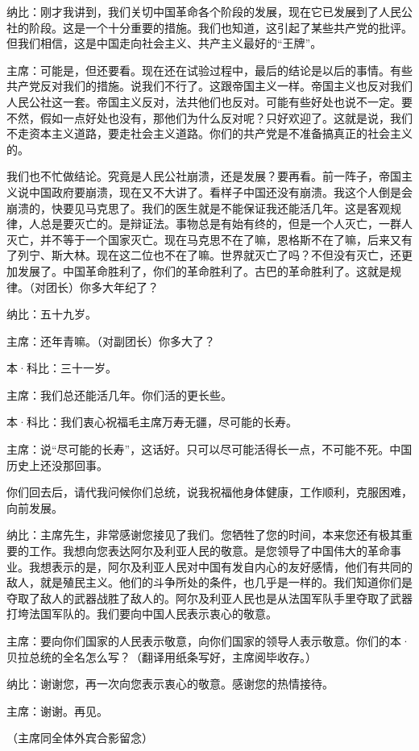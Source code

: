 纳比：刚才我讲到，我们关切中国革命各个阶段的发展，现在它已发展到了人民公社的阶段。这是一个十分重要的措施。我们也知道，这引起了某些共产党的批评。但我们相信，这是中国走向社会主义、共产主义最好的“王牌”。

主席：可能是，但还要看。现在还在试验过程中，最后的结论是以后的事情。有些共产党反对我们的措施。说我们不行了。这跟帝国主义一样。帝国主义也反对我们人民公社这一套。帝国主义反对，法共他们也反对。可能有些好处也说不一定。要不然，假如一点好处也没有，那他们为什么反对呢？只好欢迎了。这就是说，我们不走资本主义道路，要走社会主义道路。你们的共产党是不准备搞真正的社会主义的。

我们也不忙做结论。究竟是人民公社崩溃，还是发展？要再看。前一阵子，帝国主义说中国政府要崩溃，现在又不大讲了。看样子中国还没有崩溃。我这个人倒是会崩溃的，快要见马克思了。我们的医生就是不能保证我还能活几年。这是客观规律，人总是要灭亡的。是辩证法。事物总是有始有终的，但是一个人灭亡，一群人灭亡，并不等于一个国家灭亡。现在马克思不在了嘛，恩格斯不在了嘛，后来又有了列宁、斯大林。现在这二位也不在了嘛。世界就灭亡了吗？不但没有灭亡，还更加发展了。中国革命胜利了，你们的革命胜利了。古巴的革命胜利了。这就是规律。（对团长）你多大年纪了？

纳比：五十九岁。

主席：还年青嘛。（对副团长）你多大了？

本·科比：三十一岁。

主席：我们总还能活几年。你们活的更长些。

本·科比：我们衷心祝福毛主席万寿无疆，尽可能的长寿。

主席：说“尽可能的长寿”，这话好。只可以尽可能活得长一点，不可能不死。中国历史上还没那回事。

你们回去后，请代我问候你们总统，说我祝福他身体健康，工作顺利，克服困难，向前发展。

纳比：主席先生，非常感谢您接见了我们。您牺牲了您的时间，本来您还有极其重要的工作。我想向您表达阿尔及利亚人民的敬意。是您领导了中国伟大的革命事业。我想表示的是，阿尔及利亚人民对中国有发自内心的友好感情，他们有共同的敌人，就是殖民主义。他们的斗争所处的条件，也几乎是一样的。我们知道你们是夺取了敌人的武器战胜了敌人的。阿尔及利亚人民也是从法国军队手里夺取了武器打垮法国军队的。我们要向中国人民表示衷心的敬意。

主席：要向你们国家的人民表示敬意，向你们国家的领导人表示敬意。你们的本·贝拉总统的全名怎么写？（翻译用纸条写好，主席阅毕收存。）

纳比：谢谢您，再一次向您表示衷心的敬意。感谢您的热情接待。

主席：谢谢。再见。

（主席同全体外宾合影留念）


